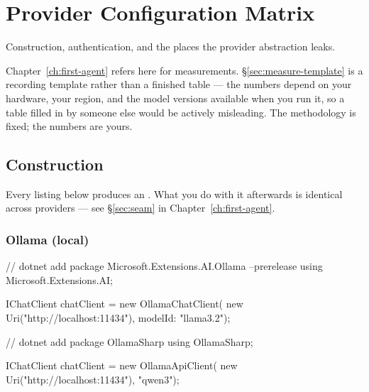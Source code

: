\chapter{Provider Configuration Matrix}
\label{app:providers}

Construction, authentication, and the places the provider abstraction leaks.

\begin{note}
Chapter~\ref{ch:first-agent} refers here for measurements. \S\ref{sec:measure-template}
is a recording template rather than a finished table --- the numbers depend on
your hardware, your region, and the model versions available when you run it, so a
table filled in by someone else would be actively misleading. The methodology is
fixed; the numbers are yours.
\end{note}

\section{Construction}

Every listing below produces an . What you do with it afterwards
is identical across providers --- see \S\ref{sec:seam} in
Chapter~\ref{ch:first-agent}.

\subsection{Ollama (local)}

\begin{csharp}[caption={Ollama via the first-party connector}, label={lst:prov-ollama}]
// dotnet add package Microsoft.Extensions.AI.Ollama --prerelease
using Microsoft.Extensions.AI;

IChatClient chatClient = new OllamaChatClient(
    new Uri("http://localhost:11434"),
    modelId: "llama3.2");
\end{csharp}

\begin{csharp}[caption={Ollama via OllamaSharp}, label={lst:prov-ollamasharp}]
// dotnet add package OllamaSharp
using OllamaSharp;

IChatClient chatClient = new OllamaApiClient(
    new Uri("http://localhost:11434"),
    "qwen3");
\end{csharp}

